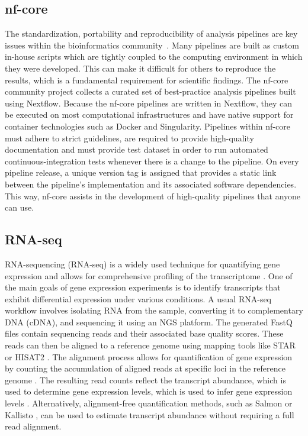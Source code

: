 \documentclass{article}
\theoremstyle{plain}
\theoremstyle{definition}
\theoremstyle{remark}
\begin{document}
\subsection{nf-core}
The standardization, portability and reproducibility of analysis pipelines are key issues within the bioinformatics community~\cite{ewels2020nf}. Many pipelines are built as custom in-house scripts which are tightly coupled to the computing environment in which they were developed. This can make it difficult for others to reproduce the results, which is a fundamental requirement for scientific findings. The nf-core community project collects a curated set of best-practice analysis pipelines built using Nextflow. Because the nf-core pipelines are written in Nextflow, they can be executed on most computational infrastructures and have native support for container technologies such as Docker and Singularity. Pipelines within nf-core must adhere to strict guidelines, are required to provide high-quality documentation and must provide test dataset in order to run automated continuous-integration tests whenever there is a change to the pipeline. On every pipeline release, a unique version tag is assigned that provides a static link between the pipeline’s implementation and its associated software dependencies. This way, nf-core assists in the development of high-quality pipelines that anyone can use.
\subsection{RNA-seq}
RNA-sequencing (RNA-seq) is a widely used technique for quantifying gene expression and allows for comprehensive profiling of the transcriptome \cite{Kukurba2015}.
One of the main goals of gene expression experiments is to identify transcripts that exhibit differential expression under various conditions.
A usual RNA-seq workflow involves isolating RNA from the sample, converting it to complementary DNA (cDNA), and sequencing it using an NGS platform.
The generated FastQ files contain sequencing reads and their associated base quality scores. These reads can then be aligned to a reference genome using mapping tools like STAR \cite{Dobin2012} or HISAT2 \cite{Kim2019}.
The alignment process allows for quantification of gene expression by counting the accumulation of aligned reads at specific loci in the reference genome \cite{Kukurba2015}. The resulting read counts reflect the transcript abundance, which is used to determine gene expression levels, which is used to infer gene expression levels \cite{Kukurba2015}.
Alternatively, alignment-free quantification methods, such as Salmon \cite{Patro2017} or Kallisto \cite{Bray2016}, can be used to estimate transcript abundance without requiring a full read alignment.
\end{document}
